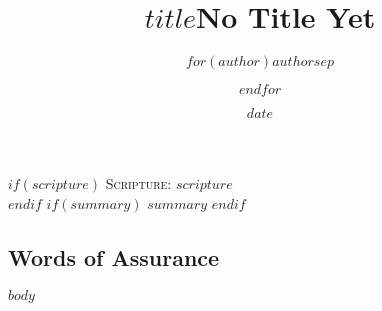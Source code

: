 \documentclass[Letter, 12pt]{report}
\title{$title$}
\title{No Title Yet}
\author{$for(author)$$author$$sep$ \and $endfor$}
\date{$date$}
\begin{document}
\maketitle
$if(scripture)$
\textsc{Scripture}: $scripture$ \\
$endif$
$if(summary)$
$summary$
$endif$

\pagebreak

\subsection{Words of Assurance}

$body$
\end{document}
